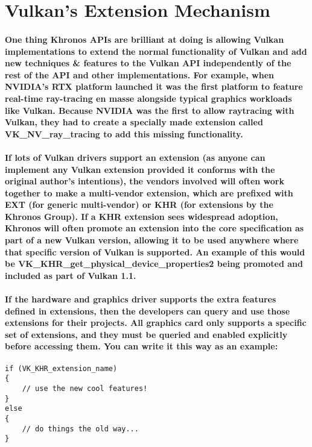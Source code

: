 \newpage
\section{\textsf{Vulkan's Extension
Mechanism}}\label{vulkans-extension-mechanism}

\paragraph{
One thing Khronos APIs are brilliant at doing is allowing Vulkan
implementations to extend the normal functionality of Vulkan and add new techniques \& features to the Vulkan API independently of the rest of the API and other implementations. For example, when NVIDIA's RTX platform launched it was the first platform to feature real-time ray-tracing en masse alongside typical graphics workloads like Vulkan. Because NVIDIA was the first to allow raytracing with Vulkan, they had to create a specially made extension called VK\_NV\_ray\_tracing to add this missing functionality.
}

\paragraph{
If lots of Vulkan drivers support an extension (as anyone can implement any Vulkan extension provided it conforms with the original author's intentions), the vendors involved will often work together to make a multi-vendor extension, which are prefixed with EXT (for generic multi-vendor) or KHR (for extensions by the Khronos Group). If a KHR extension sees widespread adoption, Khronos will often promote an extension into the core specification as part of a new Vulkan version, allowing it to be used anywhere where that specific version of Vulkan is
supported. An example of this would be VK\_KHR\_get\_physical\_device\_properties2 being promoted and included as part of Vulkan 1.1.
}

\paragraph{
If the hardware and graphics driver supports the extra features defined in extensions, then the developers can query and use those extensions for their projects. All graphics card only supports a specific set of extensions, and they must be queried and enabled explicitly before accessing them. You can write it this way as an example:
}

\begin{verbatim}
if (VK_KHR_extension_name)
{
    // use the new cool features!
}
else
{
    // do things the old way...
}
\end{verbatim}

